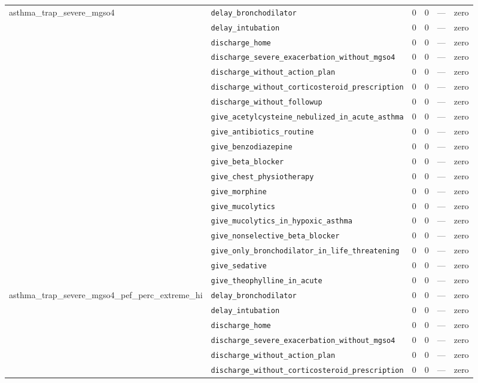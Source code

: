 \begin{table}[ht]
\begin{tabular}{llrrrl}
asthma\_trap\_severe\_mgso4 & \texttt{delay\_bronchodilator} & 0 & 0 & — & zero \\
 & \texttt{delay\_intubation} & 0 & 0 & — & zero \\
 & \texttt{discharge\_home} & 0 & 0 & — & zero \\
 & \texttt{discharge\_severe\_exacerbation\_without\_mgso4} & 0 & 0 & — & zero \\
 & \texttt{discharge\_without\_action\_plan} & 0 & 0 & — & zero \\
 & \texttt{discharge\_without\_corticosteroid\_prescription} & 0 & 0 & — & zero \\
 & \texttt{discharge\_without\_followup} & 0 & 0 & — & zero \\
 & \texttt{give\_acetylcysteine\_nebulized\_in\_acute\_asthma} & 0 & 0 & — & zero \\
 & \texttt{give\_antibiotics\_routine} & 0 & 0 & — & zero \\
 & \texttt{give\_benzodiazepine} & 0 & 0 & — & zero \\
 & \texttt{give\_beta\_blocker} & 0 & 0 & — & zero \\
 & \texttt{give\_chest\_physiotherapy} & 0 & 0 & — & zero \\
 & \texttt{give\_morphine} & 0 & 0 & — & zero \\
 & \texttt{give\_mucolytics} & 0 & 0 & — & zero \\
 & \texttt{give\_mucolytics\_in\_hypoxic\_asthma} & 0 & 0 & — & zero \\
 & \texttt{give\_nonselective\_beta\_blocker} & 0 & 0 & — & zero \\
 & \texttt{give\_only\_bronchodilator\_in\_life\_threatening} & 0 & 0 & — & zero \\
 & \texttt{give\_sedative} & 0 & 0 & — & zero \\
 & \texttt{give\_theophylline\_in\_acute} & 0 & 0 & — & zero \\
\midrule
asthma\_trap\_severe\_mgso4\_pef\_perc\_extreme\_hi & \texttt{delay\_bronchodilator} & 0 & 0 & — & zero \\
 & \texttt{delay\_intubation} & 0 & 0 & — & zero \\
 & \texttt{discharge\_home} & 0 & 0 & — & zero \\
 & \texttt{discharge\_severe\_exacerbation\_without\_mgso4} & 0 & 0 & — & zero \\
 & \texttt{discharge\_without\_action\_plan} & 0 & 0 & — & zero \\
 & \texttt{discharge\_without\_corticosteroid\_prescription} & 0 & 0 & — & zero \\

\end{tabular}
\end{table}
